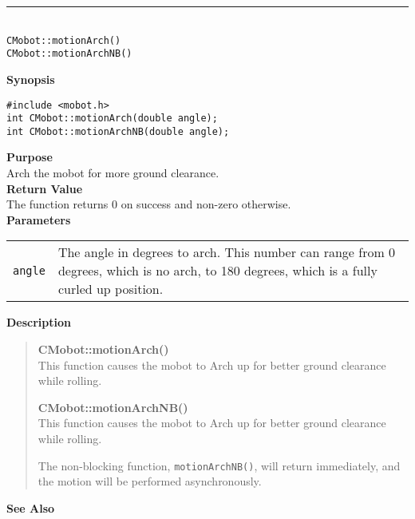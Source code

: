 \noindent
\vspace{5pt}
\rule{4.5in}{0.015in}\\
\noindent
{\LARGE \texttt{CMobot::motionArch()}}\\
{\LARGE \texttt{CMobot::motionArchNB()}}\\
{}

\noindent
{\bf Synopsis}
\vspace{-8pt}
\begin{verbatim}
#include <mobot.h>
int CMobot::motionArch(double angle);
int CMobot::motionArchNB(double angle);
\end{verbatim}

\noindent
{\bf Purpose}\\
Arch the mobot for more ground clearance.\\

\noindent
{\bf Return Value}\\
The function returns 0 on success and non-zero otherwise.\\

\noindent
{\bf Parameters}\\
\vspace{-0.1in}
\begin{description}
\item               
\begin{tabular}{p{10 mm}p{145 mm}}
\texttt{angle} & The angle in degrees to arch. This number can range from 0 degrees, which is
no arch, to 180 degrees, which is a fully curled up position.\\
\end{tabular}
\end{description}

\noindent
{\bf Description}\\
\vspace{-12pt}
\begin{quote}
{\bf CMobot::motionArch()}\\
This function causes the mobot to Arch up for better ground clearance while 
rolling.

{\bf CMobot::motionArchNB()}\\
This function causes the mobot to Arch up for better ground clearance while 
rolling.

The non-blocking function, \texttt{motionArchNB()},
will return immediately, and the motion will be performed asynchronously.\\
\end{quote}

\noindent
{\bf See Also}\\

